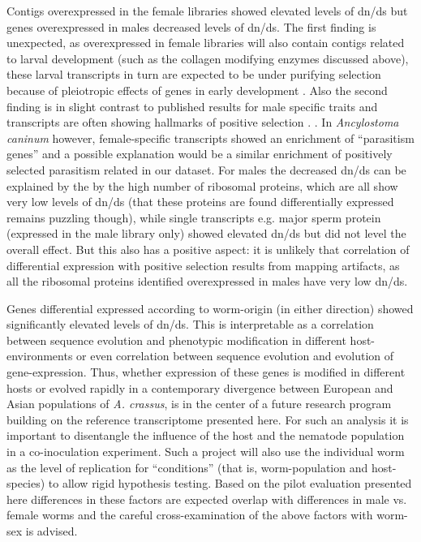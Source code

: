 \documentclass[10pt]{bmc_article}
\newenvironment{bmcformat}{\begin{raggedright}\baselineskip20pt\sloppy\setboolean{publ}{false}}{\end{raggedright}\baselineskip20pt\sloppy}
\begin{document}
\begin{bmcformat}
Contigs overexpressed in the female libraries showed elevated levels
of dn/ds but genes overexpressed in males decreased levels of
dn/ds. The first finding is unexpected, as overexpressed in female
libraries will also contain contigs related to larval development
(such as the collagen modifying enzymes discussed above), these larval
transcripts in turn are expected to be under purifying selection
because of pleiotropic effects of genes in early development
\cite{pmid15371532}. Also the second finding is in slight contrast to
published results for male specific traits and transcripts are often
showing hallmarks of positive selection
\cite{pmid15795858,pmid11404480}. . In \textit{Ancylostoma caninum}
however, female-specific transcripts showed an enrichment of
``parasitism genes'' \cite{pmid20470405} and a possible explanation
would be a similar enrichment of positively selected parasitism
related in our dataset. For males the decreased dn/ds can be explained
by the by the high number of ribosomal proteins, which are all show
very low levels of dn/ds (that these proteins are found differentially
expressed remains puzzling though), while single transcripts
e.g. major sperm protein (expressed in the male library only) showed
elevated dn/ds but did not level the overall effect. But this also has
a positive aspect: it is unlikely that correlation of differential
expression with positive selection results from mapping artifacts, as
all the ribosomal proteins identified overexpressed in males have very
low dn/ds.

Genes differential expressed according to worm-origin (in either
direction) showed significantly elevated levels of dn/ds. This is
interpretable as a correlation between sequence evolution and
phenotypic modification in different host-environments or even
correlation between sequence evolution and evolution of
gene-expression. Thus, whether expression of these genes is modified
in different hosts or evolved rapidly in a contemporary divergence
between European and Asian populations of \textit{A. crassus}, is in
the center of a future research program building on the reference
transcriptome presented here. For such an analysis it is important to
disentangle the influence of the host and the nematode population in a
co-inoculation experiment. Such a project will also use the individual
worm as the level of replication for ``conditions'' (that is,
worm-population and host-species) to allow rigid hypothesis
testing. Based on the pilot evaluation presented here differences in
these factors are expected overlap with differences in male vs. female
worms and the careful cross-examination of the above factors with
worm-sex is advised.


\end{bmcformat}
\end{document}
